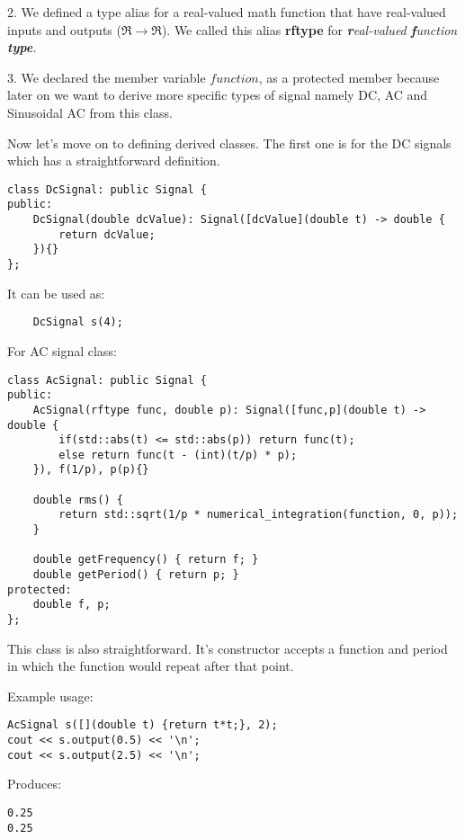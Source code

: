 \documentclass{article}
\begin{document}
	2. We defined a type alias for a real-valued math function that have real-valued inputs and outputs ($\Re\rightarrow\Re$). We called this alias \textbf{rftype} for \textit{\textbf{r}eal-valued \textbf{f}unction \textbf{type}.}
	
	3. We declared the member variable $function$, as a protected member because later on we want to derive more specific types of signal namely DC, AC and Sinusoidal AC from this class.
	 
	Now let's move on to defining derived classes. The first one is for the DC signals which has a straightforward definition.
	
	\begin{verbatim}
class DcSignal: public Signal {
public:
    DcSignal(double dcValue): Signal([dcValue](double t) -> double {
        return dcValue;
    }){}
};
	\end{verbatim}
	
	It can be used as:
	
	\begin{verbatim}
	DcSignal s(4);
	\end{verbatim}
	
	For AC signal class:
	\begin{verbatim}
class AcSignal: public Signal {
public:
    AcSignal(rftype func, double p): Signal([func,p](double t) -> double {
        if(std::abs(t) <= std::abs(p)) return func(t);
        else return func(t - (int)(t/p) * p);
    }), f(1/p), p(p){}
		
    double rms() {
        return std::sqrt(1/p * numerical_integration(function, 0, p));
    }
		
    double getFrequency() { return f; }
    double getPeriod() { return p; }
protected:
    double f, p;
};
	\end{verbatim}

	This class is also straightforward. It's constructor accepts a function and period in which the function would repeat after that point.
	
	Example usage:
	
	\begin{verbatim}
AcSignal s([](double t) {return t*t;}, 2);
cout << s.output(0.5) << '\n';
cout << s.output(2.5) << '\n';
	\end{verbatim}
	
	Produces:
	
	\begin{verbatim}
0.25
0.25
	\end{verbatim}
\end{document}
